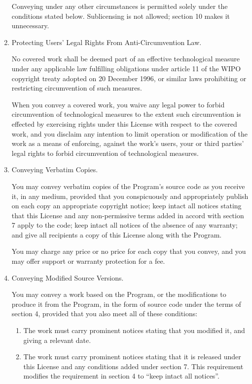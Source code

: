 \documentclass[11pt,twoside,fleqn,openright,titlepage]{cslreport}
\begin{document}
\begin{small}
\begin{enumerate}
Conveying under any other circumstances is permitted solely under
the conditions stated below.  Sublicensing is not allowed; section 10
makes it unnecessary.

\item Protecting Users' Legal Rights From Anti-Circumvention Law.

No covered work shall be deemed part of an effective technological
measure under any applicable law fulfilling obligations under article
11 of the WIPO copyright treaty adopted on 20 December 1996, or
similar laws prohibiting or restricting circumvention of such
measures.

When you convey a covered work, you waive any legal power to forbid
circumvention of technological measures to the extent such circumvention
is effected by exercising rights under this License with respect to
the covered work, and you disclaim any intention to limit operation or
modification of the work as a means of enforcing, against the work's
users, your or third parties' legal rights to forbid circumvention of
technological measures.

\item Conveying Verbatim Copies.

You may convey verbatim copies of the Program's source code as you
receive it, in any medium, provided that you conspicuously and
appropriately publish on each copy an appropriate copyright notice;
keep intact all notices stating that this License and any
non-permissive terms added in accord with section 7 apply to the code;
keep intact all notices of the absence of any warranty; and give all
recipients a copy of this License along with the Program.

You may charge any price or no price for each copy that you convey,
and you may offer support or warranty protection for a fee.

\item Conveying Modified Source Versions.

You may convey a work based on the Program, or the modifications to
produce it from the Program, in the form of source code under the
terms of section 4, provided that you also meet all of these conditions:
  \begin{enumerate}
  \item The work must carry prominent notices stating that you modified
  it, and giving a relevant date.

  \item The work must carry prominent notices stating that it is
  released under this License and any conditions added under section
  7.  This requirement modifies the requirement in section 4 to
  ``keep intact all notices''.


\end{enumerate}
\end{enumerate}
\end{small}
\end{document}
